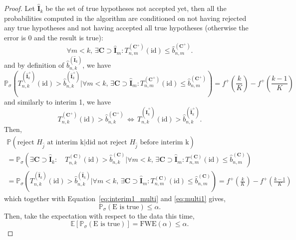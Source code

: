 \documentclass{article}
\theoremstyle{plain}
\theoremstyle{remark}
\renewcommand{\P}{\mathbb{P}}
\newcommand{\E}{\mathbb{E}}
\newcommand{\1}{\mathbbm{1}}
\newcommand{\id}{\mathrm{id}}
\numberwithin{equation}{section}
\begin{document}
\begin{proof}
Let $\widehat{\textbf{I}}_k$ be the set of true hypotheses not accepted yet, then all the probabilities computed in the algorithm are conditioned on not having rejected any true hypotheses and not having accepted all true hypotheses (otherwise the error is $0$ and the result is true):
$$\forall m < k, \, \exists \textbf{C} \supset \widehat{\textbf{I}}_m  : T_{n,m}^{(\textbf{C}^+)}(\id) \le \widehat{b}_{n,m}^{(\textbf{C}^+)}.$$
and by definition of $\widehat{b}_{n,k}^{(\widehat{\textbf{I}}_k)}$, we have
$$\P_\sigma\left( T_{n,k}^{(\widehat{\textbf{I}}_k^+)}(\id)> \widehat{b}_{n,k}^{(\widehat{\textbf{I}}_k^+)} \Big|\forall m < k, \, \exists \textbf{C} \supset \widehat{\textbf{I}}_m  : T_{n,m}^{(\textbf{C}^+)}(\id) \le \widehat{b}_{n,m}^{(\textbf{C}^+)}\right) = f^+\left(\frac{k}{K}\right)-f^+\left(\frac{k-1}{K}\right) $$
and similarly to interim 1, we have 
$$T_{n,k}^{(\textbf{C}^+)}(\id)> \widehat{b}_{n,k}^{(\textbf{C}^+)}\, \Leftrightarrow \,
 T_{n,k}^{(\widehat{\textbf{I}}_k^+)}(\id) > \widehat{b}_{n,k}^{(\widehat{\textbf{I}}_k^+)}.$$
Then,
 \begin{multline*}
\P\left(\text{reject }H_{\widehat{j}} \text{ at interim k} \Big| \text{did not reject }H_{\widehat{j}} \text{ before interim k}\right)\\
= \P_\sigma\left( \exists \textbf{C} \supset \widehat{\textbf{I}}_k :\quad  T_{n,k}^{(\textbf{C})}(\id)> \widehat{b}_{n,k}^{(\textbf{C})} \Big|  \forall m < k, \, \exists \textbf{C} \supset \widehat{\textbf{I}}_m  : T_{n,m}^{(\textbf{C})}(\id) \le \widehat{b}_{n,m}^{(\textbf{C})}\right)\\
= \P_\sigma\left(T_{n,k}^{(\widehat{\textbf{I}}_k)}(\id) > \widehat{b}_{n,k}^{(\widehat{\textbf{I}}_k)}\Big|  \forall m < k, \, \exists \textbf{C} \supset \widehat{\textbf{I}}_m  : T_{n,m}^{(\textbf{C})}(\id) \le \widehat{b}_{n,m}^{(\textbf{C})} \right)
 = f^+\left(\frac{k}{K}\right)-f^+\left(\frac{k-1}{K}\right)
\end{multline*}
which together with Equation~\eqref{eq:interim1_multi} and \eqref{eq:multi1} gives,
$$\P_\sigma(\text{E is true})\le \alpha.$$
Then, take the expectation with respect to the data this time, 
$$\E\left[\P_\sigma(\text{E is true})\right] = \mathrm{FWE}(\alpha) \le \alpha. $$
\end{proof}
\end{document}
